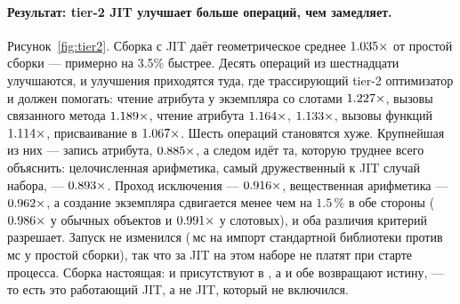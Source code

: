 \paragraph{Результат: tier-2 JIT улучшает больше операций, чем замедляет.}
Рисунок~\ref{fig:tier2}. Сборка с JIT даёт геометрическое среднее
$\meas{geomean:b5_buildcfg-plain|b5_buildcfg-jit}{1.035}\times$ от простой сборки --- примерно на 3.5\% быстрее. Десять операций из шестнадцати
улучшаются, и улучшения приходятся туда, где трассирующий tier-2 оптимизатор и должен помогать:
чтение атрибута у экземпляра со слотами $\meas{ratio:b5_buildcfg-plain:attr_get_slots/plain|b5_buildcfg-jit:attr_get_slots/jit}{1.227}\times$, вызовы связанного метода $\meas{ratio:b5_buildcfg-plain:method_call/plain|b5_buildcfg-jit:method_call/jit}{1.189}\times$,
чтение атрибута $\meas{ratio:b5_buildcfg-plain:attr_get/plain|b5_buildcfg-jit:attr_get/jit}{1.164}\times$,  $\meas{ratio:b5_buildcfg-plain:list_append/plain|b5_buildcfg-jit:list_append/jit}{1.133}\times$, вызовы функций $\meas{ratio:b5_buildcfg-plain:func_call/plain|b5_buildcfg-jit:func_call/jit}{1.114}\times$,
присваивание в  $\meas{ratio:b5_buildcfg-plain:dict_setitem/plain|b5_buildcfg-jit:dict_setitem/jit}{1.067}\times$. Шесть операций становятся хуже. Крупнейшая из них ---
запись атрибута, $\meas{ratio:b5_buildcfg-plain:attr_set/plain|b5_buildcfg-jit:attr_set/jit}{0.885}\times$, а следом идёт та, которую труднее всего объяснить: целочисленная
арифметика, самый дружественный к JIT случай набора, --- $\meas{ratio:b5_buildcfg-plain:int_arith/plain|b5_buildcfg-jit:int_arith/jit}{0.893}\times$. Проход исключения ---
$\meas{ratio:b5_buildcfg-plain:exception_roundtrip/plain|b5_buildcfg-jit:exception_roundtrip/jit}{0.916}\times$, вещественная арифметика --- $\meas{ratio:b5_buildcfg-plain:float_arith/plain|b5_buildcfg-jit:float_arith/jit}{0.962}\times$, а создание экземпляра сдвигается менее чем
на $1.5\,\%$ в обе стороны ($\meas{ratio:b5_buildcfg-plain:create_plain_obj/plain|b5_buildcfg-jit:create_plain_obj/jit}{0.986}\times$ у обычных объектов и $\meas{ratio:b5_buildcfg-plain:create_slots_obj/plain|b5_buildcfg-jit:create_slots_obj/jit}{0.991}\times$ у слотовых), и оба
различия критерий разрешает. Запуск не изменился
(\,мс на импорт стандартной библиотеки против \,мс у простой сборки), так что за JIT на
этом наборе не платят при старте процесса. Сборка настоящая:  и 
присутствуют в , а  и
 обе возвращают истину, --- то есть это работающий JIT, а не JIT,
который не включился.

